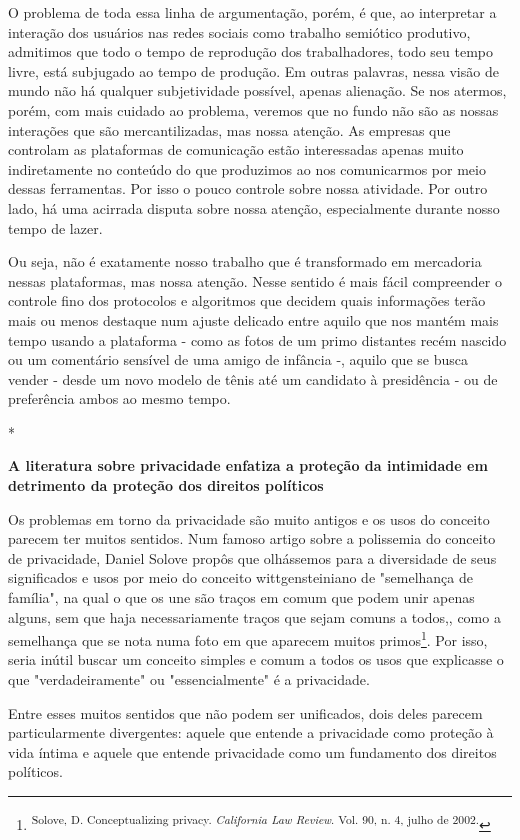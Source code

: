 O problema de toda essa linha de argumentação, porém, é que, ao
interpretar a interação dos usuários nas redes sociais como trabalho
semiótico produtivo, admitimos que todo o tempo de reprodução dos
trabalhadores, todo seu tempo livre, está subjugado ao tempo de
produção. Em outras palavras, nessa visão de mundo não há qualquer
subjetividade possível, apenas alienação. Se nos atermos, porém, com
mais cuidado ao problema, veremos que no fundo não são as nossas
interações que são mercantilizadas, mas nossa atenção. As empresas que
controlam as plataformas de comunicação estão interessadas apenas muito
indiretamente no conteúdo do que produzimos ao nos comunicarmos por meio
dessas ferramentas. Por isso o pouco controle sobre nossa atividade. Por
outro lado, há uma acirrada disputa sobre nossa atenção, especialmente
durante nosso tempo de lazer.

Ou seja, não é exatamente nosso trabalho que é transformado em
mercadoria nessas plataformas, mas nossa atenção. Nesse sentido é mais
fácil compreender o controle fino dos protocolos e algoritmos que
decidem quais informações terão mais ou menos destaque num ajuste
delicado entre aquilo que nos mantém mais tempo usando a plataforma -
como as fotos de um primo distantes recém nascido ou um comentário
sensível de uma amigo de infância -, aquilo que se busca vender - desde
um novo modelo de tênis até um candidato à presidência - ou de
preferência ambos ao mesmo tempo.

*

\textbf{A literatura sobre privacidade enfatiza a proteção da intimidade
em detrimento da proteção dos direitos políticos}

Os problemas em torno da privacidade são muito antigos e os usos do
conceito parecem ter muitos sentidos. Num famoso artigo sobre a
polissemia do conceito de privacidade, Daniel Solove propôs que
olhássemos para a diversidade de seus significados e usos por meio do
conceito wittgensteiniano de "semelhança de família", na qual o que os
une são traços em comum que podem unir apenas alguns, sem que haja
necessariamente traços que sejam comuns a todos,, como a semelhança que
se nota numa foto em que aparecem muitos primos\footnote{\textsuperscript{Solove,
  D. Conceptualizing privacy. \emph{California Law Review}. Vol. 90, n.
  4, julho de 2002.}}. Por isso, seria inútil buscar um conceito simples
e comum a todos os usos que explicasse o que "verdadeiramente" ou
"essencialmente" é a privacidade.

Entre esses muitos sentidos que não podem ser unificados, dois deles
parecem particularmente divergentes: aquele que entende a privacidade
como proteção à vida íntima e aquele que entende privacidade como um
fundamento dos direitos políticos.

